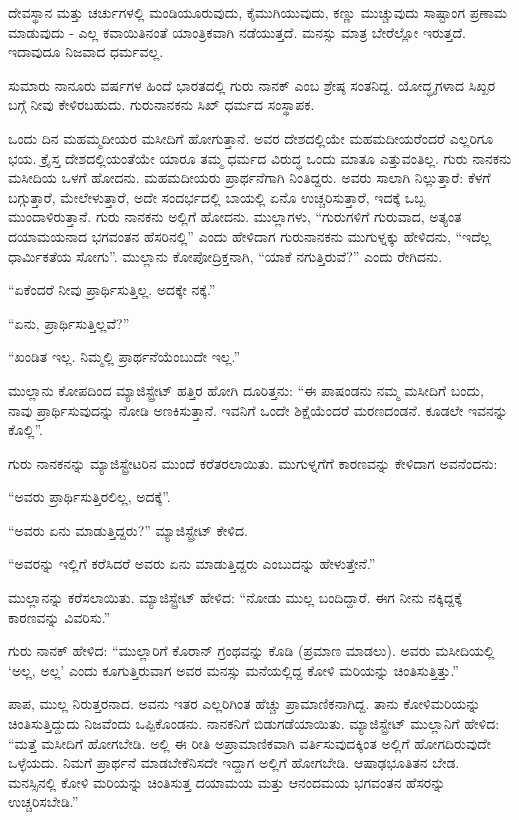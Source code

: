 ದೇವಸ್ಥಾನ ಮತ್ತು ಚರ್ಚುಗಳಲ್ಲಿ ಮಂಡಿಯೂರುವುದು, ಕೈಮುಗಿಯುವುದು, ಕಣ್ಣು ಮುಚ್ಚುವುದು ಸಾಷ್ಟಾಂಗ ಪ್ರಣಾಮ ಮಾಡುವುದು - ಎಲ್ಲ ಕವಾಯಿತಿನಂತೆ ಯಾಂತ್ರಿಕವಾಗಿ ನಡೆಯುತ್ತದೆ. ಮನಸ್ಸು ಮಾತ್ರ ಬೇರೆಲ್ಲೋ ಇರುತ್ತದೆ. ಇದಾವುದೂ ನಿಜವಾದ ಧರ್ಮವಲ್ಲ.

ಸುಮಾರು ನಾನೂರು ವರ್ಷಗಳ ಹಿಂದೆ ಭಾರತದಲ್ಲಿ ಗುರು ನಾನಕ್ ಎಂಬ ಶ್ರೇಷ್ಠ ಸಂತನಿದ್ದ. ಯೋದ್ಧೃಗಳಾದ ಸಿಖ್ಖರ ಬಗ್ಗೆ ನೀವು ಕೇಳಿರಬಹುದು. ಗುರುನಾನಕನು ಸಿಖ್ ಧರ್ಮದ ಸಂಸ್ಥಾಪಕ.

ಒಂದು ದಿನ ಮಹಮ್ಮದೀಯರ ಮಸೀದಿಗೆ ಹೋಗುತ್ತಾನೆ. ಅವರ ದೇಶದಲ್ಲಿಯೇ ಮಹಮದೀಯರೆಂದರೆ ಎಲ್ಲರಿಗೂ ಭಯ. ಕ್ರೈಸ್ತ ದೇಶದಲ್ಲಿಯಂತೆಯೇ ಯಾರೂ ತಮ್ಮ ಧರ್ಮದ ವಿರುದ್ಧ ಒಂದು ಮಾತೂ ಎತ್ತುವಂತಿಲ್ಲ. ಗುರು ನಾನಕನು ಮಸೀದಿಯ ಒಳಗೆ ಹೋದನು. ಮಹಮದೀಯರು ಪ್ರಾರ್ಥನೆಗಾಗಿ ನಿಂತಿದ್ದರು. ಅವರು ಸಾಲಾಗಿ ನಿಲ್ಲುತ್ತಾರೆ: ಕೆಳಗೆ ಬಗ್ಗುತ್ತಾರೆ, ಮೇಲೇಳುತ್ತಾರೆ, ಅದೇ ಸಂದರ್ಭದಲ್ಲಿ ಬಾಯಲ್ಲಿ ಏನೊ ಉಚ್ಚರಿಸುತ್ತಾರೆ, ಇದಕ್ಕೆ ಒಬ್ಬ ಮುಂದಾಳಿರುತ್ತಾನೆ. ಗುರು ನಾನಕನು ಅಲ್ಲಿಗೆ ಹೋದನು. ಮುಲ್ಲಾಗಳು, “ಗುರುಗಳಿಗೆ ಗುರುವಾದ, ಅತ್ಯಂತ ದಯಾಮಯನಾದ ಭಗವಂತನ ಹೆಸರಿನಲ್ಲಿ” ಎಂದು ಹೇಳಿದಾಗ ಗುರುನಾನಕನು ಮುಗುಳ್ನಕ್ಕು ಹೇಳಿದನು, “ಇದೆಲ್ಲ ಧಾರ್ಮಿಕತೆಯ ಸೋಗು”. ಮುಲ್ಲಾನು ಕೋಪೋದ್ರಿಕ್ತನಾಗಿ, “ಯಾಕೆ ನಗುತ್ತಿರುವೆ?” ಎಂದು ರೇಗಿದನು.

“ಏಕೆಂದರೆ ನೀವು ಪ್ರಾರ್ಥಿಸುತ್ತಿಲ್ಲ. ಅದಕ್ಕೇ ನಕ್ಕೆ.”

“ಏನು, ಪ್ರಾರ್ಥಿಸುತ್ತಿಲ್ಲವೆ?”

“ಖಂಡಿತ ಇಲ್ಲ. ನಿಮ್ಮಲ್ಲಿ ಪ್ರಾರ್ಥನೆಯೆಂಬುದೇ ಇಲ್ಲ.”

ಮುಲ್ಲಾನು ಕೋಪದಿಂದ ಮ್ಯಾಜಿಸ್ಟ್ರೇಟ್ ಹತ್ತಿರ ಹೋಗಿ ದೂರಿತ್ತನು: “ಈ ಪಾಷಂಡನು ನಮ್ಮ ಮಸೀದಿಗೆ ಬಂದು, ನಾವು ಪ್ರಾರ್ಥಿಸುವುದನ್ನು ನೋಡಿ ಅಣಕಿಸುತ್ತಾನೆ. ಇವನಿಗೆ ಒಂದೇ ಶಿಕ್ಷೆಯೆಂದರೆ ಮರಣದಂಡನೆ. ಕೂಡಲೇ ಇವನನ್ನು ಕೊಲ್ಲಿ”.

ಗುರು ನಾನಕನನ್ನು ಮ್ಯಾಜಿಸ್ಟ್ರೇಟರಿನ ಮುಂದೆ ಕರೆತರಲಾಯಿತು. ಮುಗುಳ್ನಗೆಗೆ ಕಾರಣವನ್ನು ಕೇಳಿದಾಗ ಅವನೆಂದನು:

“ಅವರು ಪ್ರಾರ್ಥಿಸುತ್ತಿರಲಿಲ್ಲ, ಅದಕ್ಕೆ”.

“ಅವರು ಏನು ಮಾಡುತ್ತಿದ್ದರು?” ಮ್ಯಾಜಿಸ್ಟ್ರೇಟ್ ಕೇಳಿದ.

“ಅವರನ್ನು ಇಲ್ಲಿಗೆ ಕರೆಸಿದರೆ ಅವರು ಏನು ಮಾಡುತ್ತಿದ್ದರು ಎಂಬುದನ್ನು ಹೇಳುತ್ತೇನೆ.”

ಮುಲ್ಲಾನನ್ನು ಕರೆಸಲಾಯಿತು. ಮ್ಯಾಜಿಸ್ಟ್ರೇಟ್ ಹೇಳಿದ: “ನೋಡು ಮುಲ್ಲ ಬಂದಿದ್ದಾರೆ. ಈಗ ನೀನು ನಕ್ಕಿದ್ದಕ್ಕೆ ಕಾರಣವನ್ನು ವಿವರಿಸು.”

ಗುರು ನಾನಕ್ ಹೇಳಿದ: “ಮುಲ್ಲಾರಿಗೆ ಕೊರಾನ್ ಗ್ರಂಥವನ್ನು ಕೊಡಿ (ಪ್ರಮಾಣ ಮಾಡಲು). ಅವರು ಮಸೀದಿಯಲ್ಲಿ ‘ಅಲ್ಲ, ಅಲ್ಲ’ ಎಂದು ಕೂಗುತ್ತಿರುವಾಗ ಅವರ ಮನಸ್ಸು ಮನೆಯಲ್ಲಿದ್ದ ಕೋಳಿ ಮರಿಯನ್ನು ಚಿಂತಿಸುತ್ತಿತ್ತು.”

ಪಾಪ, ಮುಲ್ಲ ನಿರುತ್ತರನಾದ. ಅವನು ಇತರ ಎಲ್ಲರಿಗಿಂತ ಹೆಚ್ಚು ಪ್ರಾಮಾಣಿಕನಾಗಿದ್ದ. ತಾನು ಕೋಳಿಮರಿಯನ್ನು ಚಿಂತಿಸುತ್ತಿದ್ದುದು ನಿಜವೆಂದು ಒಪ್ಪಿಕೊಂಡನು. ನಾನಕನಿಗೆ ಬಿಡುಗಡೆಯಾಯಿತು. ಮ್ಯಾಜಿಸ್ಟ್ರೇಟ್ ಮುಲ್ಲಾನಿಗೆ ಹೇಳಿದ: “ಮತ್ತೆ ಮಸೀದಿಗೆ ಹೋಗಬೇಡಿ. ಅಲ್ಲಿ ಈ ರೀತಿ ಅಪ್ರಾಮಾಣಿಕವಾಗಿ ವರ್ತಿಸುವುದಕ್ಕಿಂತ ಅಲ್ಲಿಗೆ ಹೋಗದಿರುವುದೇ ಒಳ್ಳೆಯದು. ನಿಮಗೆ ಪ್ರಾರ್ಥನೆ ಮಾಡಬೇಕೆನಿಸದೇ ಇದ್ದಾಗ ಅಲ್ಲಿಗೆ ಹೋಗಬೇಡಿ. ಆಷಾಢಭೂತಿತನ ಬೇಡ. ಮನಸ್ಸಿನಲ್ಲಿ ಕೋಳಿ ಮರಿಯನ್ನು ಚಿಂತಿಸುತ್ತ ದಯಾಮಯ ಮತ್ತು ಆನಂದಮಯ ಭಗವಂತನ ಹೆಸರನ್ನು ಉಚ್ಚರಿಸಬೇಡಿ.”

